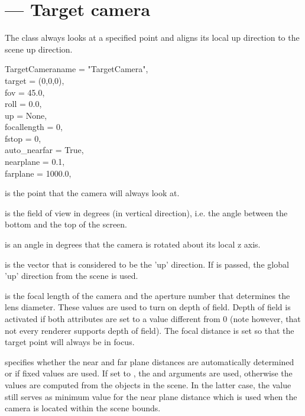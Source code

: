 
\section{ ---
         Target camera}

The  class always looks at a specified point and
aligns its local up direction to the scene up direction.

\begin{classdesc}{TargetCamera}{name = "TargetCamera",\\ 
                       target = (0,0,0),\\
                       fov = 45.0,\\
                       roll = 0.0, \\
                       up = None,\\
                       focallength = 0,\\
                       fstop = 0,\\
                       auto_nearfar = True,\\
                       nearplane = 0.1,\\
                       farplane = 1000.0,\\
                       }

 is the point that the camera will always look at. 

 is the field of view in degrees (in vertical direction), i.e.
the angle between the bottom and the top of the screen.

 is an angle in degrees that the camera is rotated about its 
local z axis.

 is the vector that is considered to be the 'up' direction. If
 is passed, the global 'up' direction from the scene is used.

 is the focal length of the camera and  the
aperture number that determines the lens diameter. These values are used
to turn on depth of field. Depth of field is activated if both attributes
are set to a value different from 0 (note however, that not every renderer
supports depth of field). The focal distance is set so that the target 
point will always be in focus.

 specifies whether the near and far plane
distances are automatically determined or if fixed values are used.
If set to , the  and  arguments
are used, otherwise the values are computed from the objects in the scene.
In the latter case, the  value still serves as minimum
value for the near plane distance which is used when the camera is located
within the scene bounds.
\end{classdesc}


